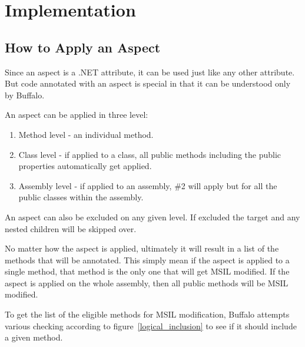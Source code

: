 \chapter{Implementation}

\section{How to Apply an Aspect}

Since an aspect is a .NET attribute, it can be used just like any other attribute. But code annotated with an aspect is special in that it can be understood only by Buffalo.

An aspect can be applied in three level:

\begin{enumerate}
  \item Method level - an individual method.
  \item Class level - if applied to a class, all public methods including the public properties automatically get applied.
  \item Assembly level - if applied to an assembly, \#2 will apply but for all the public classes within the assembly.
\end{enumerate}

An aspect can also be excluded on any given level. If excluded the target and any nested children will be skipped over. 

No matter how the aspect is applied, ultimately it will result in a list of the methods that will be annotated. This simply mean if the aspect is applied to a single method, that method is the only one that will get MSIL modified. If the aspect is applied on the whole assembly, then all public methods will be MSIL modified.

To get the list of the eligible methods for MSIL modification, Buffalo attempts various checking according to figure~\ref{logical_inclusion} to see if it should include a given method.

